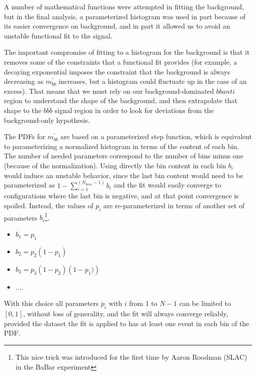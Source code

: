 A number of mathematical functions were attempted in fitting the
background, but in the final analysis, a parameterized histogram was
used in part because of its easier convergence on background, and
in part it allowed us to avoid an unstable functional fit to the signal.

The important compromise of fitting to a histogram for the
background is that it removes some of the constraints that a functional
fit provides (for example, a decaying exponential imposes the constraint
that the background is always decreasing as $m^{'}_{bb}$ increases, 
but a histogram could fluctuate up in the case of an excess).  That 
means that we must rely on our background-dominated $bbanti$ region
to understand the shape of the background, and then extrapolate that
shape to the $bbb$ signal region in order to look for deviations from
the background-only hypothesis.  



The PDFs for $m^{'}_{bb}$ are based on a parameterized step function,
which is equivalent to parameterizing a normalized histogram in terms of the content of each
bin. The number of needed parameters correspond to the number of bins minus one
(because of the normalization). Using directly the bin content in each bin
$b_{i}$ would induce an unstable behavior, since the last bin
content would need to be parameterized as $1-\sum_{i=1}^{(N_{bins}-1)} b_{i}$
and the fit would easily converge to configurations where the last bin is negative,
and at that point convergence is spoiled. Instead, the values of $p_{i}$
are re-parameterized in terms of another set of parameters
$b_{i}$\footnote{This nice trick was introduced for the first time by Aaron Roodman (SLAC) in the BaBar experiment}.

\begin{itemize}
\item $b_{1} = p_{1}$
\item $b_{2} = p_{2} \left(1-p_{1}\right)$
\item $b_{3} = p_{3} \left(1-p_{2} \right) \left( 1-p_{1}) \right)$
\item $....$
\end{itemize}
With this choice all parameters $p_{i}$ with $i$ from 
1 to $N-1$ can be limited to $[0,1]$, without loss of generality, 
and the fit will always converge reliably, provided the dataset the fit is applied 
to has at least one event in each bin of the PDF.

